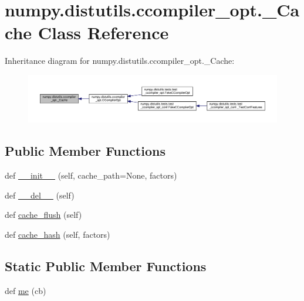 \hypertarget{classnumpy_1_1distutils_1_1ccompiler__opt_1_1__Cache}{}\section{numpy.\+distutils.\+ccompiler\+\_\+opt.\+\_\+\+Cache Class Reference}
\label{classnumpy_1_1distutils_1_1ccompiler__opt_1_1__Cache}


Inheritance diagram for numpy.\+distutils.\+ccompiler\+\_\+opt.\+\_\+\+Cache\+:
\nopagebreak
\begin{figure}[H]
\begin{center}
\leavevmode
\includegraphics[width=350pt]{classnumpy_1_1distutils_1_1ccompiler__opt_1_1__Cache__inherit__graph}
\end{center}
\end{figure}
\subsection*{Public Member Functions}
\begin{DoxyCompactItemize}
\item 
def \hyperlink{classnumpy_1_1distutils_1_1ccompiler__opt_1_1__Cache_afb3386dbb8eeb48ff979dd3e63be2d94}{\+\_\+\+\_\+init\+\_\+\+\_\+} (self, cache\+\_\+path=None, factors)
\item 
def \hyperlink{classnumpy_1_1distutils_1_1ccompiler__opt_1_1__Cache_af58b29187dbcccdb95d0c1db60d33d12}{\+\_\+\+\_\+del\+\_\+\+\_\+} (self)
\item 
def \hyperlink{classnumpy_1_1distutils_1_1ccompiler__opt_1_1__Cache_ab77b9e622af9ff51496950138fccd205}{cache\+\_\+flush} (self)
\item 
def \hyperlink{classnumpy_1_1distutils_1_1ccompiler__opt_1_1__Cache_a6fa0e4b931e318426ecf7d814caf3111}{cache\+\_\+hash} (self, factors)
\end{DoxyCompactItemize}
\subsection*{Static Public Member Functions}
\begin{DoxyCompactItemize}
\item 
def \hyperlink{classnumpy_1_1distutils_1_1ccompiler__opt_1_1__Cache_a280a32ac569cae8ee06454ed34cee7a8}{me} (cb)
\end{DoxyCompactItemize}
